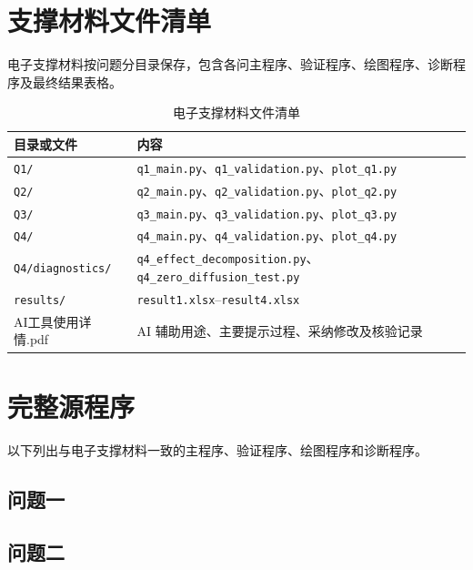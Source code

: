 \section{支撑材料文件清单}

电子支撑材料按问题分目录保存，包含各问主程序、验证程序、绘图程序、诊断程序及最终结果表格。

\begin{table}[H]
\centering
\caption{电子支撑材料文件清单}
\label{tab:supporting-materials-list}
\begin{tabular}{@{}ll@{}}
\toprule
目录或文件 & 内容 \\
\midrule
\texttt{Q1/} & \texttt{q1\_main.py}、\texttt{q1\_validation.py}、\texttt{plot\_q1.py} \\
\texttt{Q2/} & \texttt{q2\_main.py}、\texttt{q2\_validation.py}、\texttt{plot\_q2.py} \\
\texttt{Q3/} & \texttt{q3\_main.py}、\texttt{q3\_validation.py}、\texttt{plot\_q3.py} \\
\texttt{Q4/} & \texttt{q4\_main.py}、\texttt{q4\_validation.py}、\texttt{plot\_q4.py} \\
\texttt{Q4/diagnostics/} & \texttt{q4\_effect\_decomposition.py}、\texttt{q4\_zero\_diffusion\_test.py} \\
\texttt{results/} & \texttt{result1.xlsx}--\texttt{result4.xlsx} \\
AI工具使用详情.pdf & AI 辅助用途、主要提示过程、采纳修改及核验记录 \\
\bottomrule
\end{tabular}
\end{table}

\section{完整源程序}

以下列出与电子支撑材料一致的主程序、验证程序、绘图程序和诊断程序。

\subsection{问题一}




\subsection{问题二}




